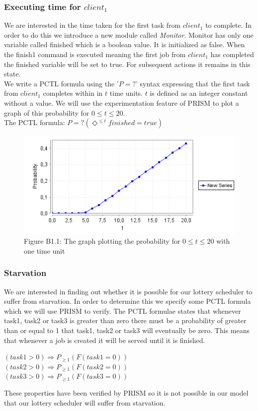 \documentclass[12pt]{report}
\begin{document}
\subsubsection*{Executing time for $client_1$}
We are interested in the time taken for the first task from $client_1$ to complete. In order to do this we introduce a new module called \emph{Monitor}. Monitor has only one variable called finished which is a boolean value. It is initialized as false. When the finish1 command is executed meaning the first job from $client_1$ has completed the finished variable will be set to true. For subsequent actions it remains in this state.\\
We write a PCTL formula using the '$P=?$' syntax expressing that the first task from $client_1$ completes within in $t$ time units. $t$ is defined as an integer constant without a value. We will use the experimentation feature of PRISM to plot a graph of this probability for $0 \leq t \leq 20$.\\
The PCTL formula: $P=? (\Diamond^{\leq t} finished=true)$\\
\begin{figure}[H]
	\centering
	\includegraphics[scale=0.75]{../GFX/B1-1c.png}\\
	Figure B1.1: The graph plotting the probability for $0 \leq t \leq 20$ with one time unit
\end{figure}

\subsubsection*{Starvation}
We are interested in finding out whether it is possible for our lottery scheduler to suffer from starvation. In order to determine this we specify some PCTL formula which we will use PRISM to verify. The PCTL formulae states that whenever task1, task2 or task3 is greater than zero there must be a probability of greater than or equal to 1 that task1, task2 or task3 will eventually be zero. This means that whenever a job is created it will be served until it is finished.
\begin{center}
$(task1 > 0) \Rightarrow P_{\geq 1}(F(task1 = 0))$\\
$(task2 > 0) \Rightarrow P_{\geq 1}(F(task2 = 0))$\\
$(task3 > 0) \Rightarrow P_{\geq 1} (F(task3 = 0))$
\end{center}
These properties have been verified by PRISM so it is not possible in our model that our lottery scheduler will suffer from starvation.
\end{document}
